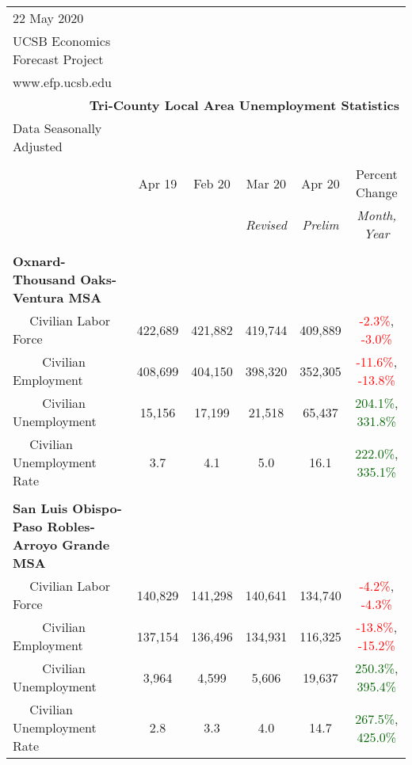 \documentclass[12pt]{article}
\begin{document}
\begin{landscape}
\begin{table}
\begin{tabular}{|l|c|c|c|c|c|}
\multicolumn{1}{l}{\small 22 May 2020} & \multicolumn{5}{c}{} \\
\multicolumn{1}{l}{\small UCSB Economics Forecast Project} & \multicolumn{5}{c}{} \\
\multicolumn{1}{l}{\small www.efp.ucsb.edu} & \multicolumn{5}{c}{} \\
\multicolumn{6}{r}{\large \textbf{Tri-County Local Area Unemployment Statistics}} \\
\multicolumn{1}{l}{\small Data Seasonally Adjusted} & \multicolumn{5}{c}{} \\ \hline \hline
& & & & & \\
 & Apr 19 & Feb 20 & Mar 20 & Apr 20 & Percent Change \\
 & & & \small \textit{Revised} & \small \textit{Prelim} & \small \textit{Month, Year} \\ \hline
&&&&& \\
\textbf{Oxnard-Thousand Oaks-Ventura MSA} &&&&& \\
$\quad$ Civilian Labor Force &422,689 & 421,882 & 419,744 & 409,889 & \textcolor{red}{-2.3\%}, \textcolor{red}{-3.0\%} \\
$\qquad$ \small Civilian Employment &408,699 & 404,150 & 398,320 & 352,305 & \textcolor{red}{-11.6\%}, \textcolor{red}{-13.8\%} \\
$\qquad$ \small Civilian Unemployment &15,156 & 17,199 & 21,518 & 65,437 & \textcolor{darkgreen}{204.1\%}, \textcolor{darkgreen}{331.8\%} \\
$\quad$ Civilian Unemployment Rate &3.7 & 4.1 & 5.0 & 16.1 & \textcolor{darkgreen}{222.0\%}, \textcolor{darkgreen}{335.1\%} \\
&&&&& \\
\textbf{San Luis Obispo-Paso Robles-Arroyo Grande MSA} &&&&& \\
$\quad$ Civilian Labor Force &140,829 & 141,298 & 140,641 & 134,740 & \textcolor{red}{-4.2\%}, \textcolor{red}{-4.3\%} \\
$\qquad$ \small Civilian Employment &137,154 & 136,496 & 134,931 & 116,325 & \textcolor{red}{-13.8\%}, \textcolor{red}{-15.2\%} \\
$\qquad$ \small Civilian Unemployment &3,964 & 4,599 & 5,606 & 19,637 & \textcolor{darkgreen}{250.3\%}, \textcolor{darkgreen}{395.4\%} \\
$\quad$ Civilian Unemployment Rate &2.8 & 3.3 & 4.0 & 14.7 & \textcolor{darkgreen}{267.5\%}, \textcolor{darkgreen}{425.0\%} \\

\end{tabular}
\end{table}
\end{landscape}
\end{document}
